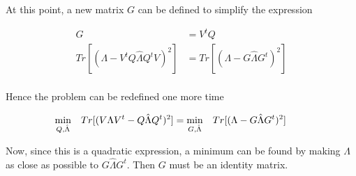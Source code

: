 \documentclass[12pt,journal]{IEEEtran}
\begin{document}
    At this point, a new matrix $G$ can be defined to simplify the expression

    \begin{equation*}
        \begin{aligned}
            G &= V^tQ\\
            Tr[(\Lambda - V^tQ \hat{\Lambda} Q^tV)^2] &= Tr[(\Lambda - G \hat{\Lambda} G^t)^2]\\
        \end{aligned}
    \end{equation*}

    Hence the problem can be redefined one more time

    \begin{equation*}
        \hspace{-0.5cm}
        \begin{aligned}
        \underset{Q,\hat{\Lambda}}{\text{min}} \quad Tr[(V\Lambda V^t - Q \hat{\Lambda} Q^t)^2]
        &=
        \underset{G,\hat{\Lambda}}{\text{min}} \quad Tr[(\Lambda - G \hat{\Lambda} G^t)^2]
        \end{aligned}
    \end{equation*}

    Now, since this is a quadratic expression, a minimum can be found by making
    $\Lambda$ as close as possible to $G \hat{\Lambda} G^t$. Then $G$ must be
    an identity matrix.\\ 
\end{document}
